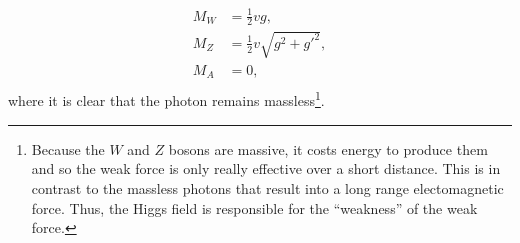 \begin{equation}
\label{eq:massesHiggs}
\begin{split}
M_W &= \frac{1}{2}vg,\\
M_Z &= \frac{1}{2}v\sqrt{g^2+g'^2},\\
M_A &= 0,\\
\end{split}
\end{equation}
where it is clear that the photon remains massless\footnote{Because the $W$ and $Z$ bosons are massive, it costs energy to produce them and so the weak force is only really effective over a short distance. This is in contrast to the massless photons that result into a long range electomagnetic force. Thus, the Higgs field is responsible for the ``weakness'' of the weak force.}.\\






